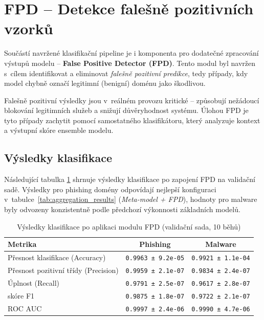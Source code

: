 \section{FPD – Detekce falešně pozitivních vzorků}
\label{sec:fpd}

Součástí navržené klasifikační pipeline je i komponenta pro dodatečné zpracování výstupů modelu – \textbf{False Positive Detector (FPD)}. Tento modul byl navržen s~cílem identifikovat a eliminovat \textit{falešně pozitivní predikce}, tedy případy, kdy model chybně označí legitimní (benigní) doménu jako škodlivou.

Falešně pozitivní výsledky jsou v~reálném provozu kritické – způsobují nežádoucí blokování legitimních služeb a snižují důvěryhodnost systému. Úlohou FPD je tyto případy zachytit pomocí samostatného klasifikátoru, který analyzuje kontext a výstupní skóre ensemble modelu.

\subsection{Výsledky klasifikace}
Následující tabulka \ref{tab:fpd_results} shrnuje výsledky klasifikace po zapojení FPD na validační sadě. Výsledky pro phishing domény odpovídají nejlepší konfiguraci v~tabulce~\ref{tab:aggregation_results} (\textit{Meta-model + FPD}), hodnoty pro malware byly odvozeny konzistentně podle předchozí výkonnosti základních modelů.

\begin{table}[H]
\centering
\begin{tabular}{|l|c|c|}
\hline
\textbf{Metrika} & \textbf{Phishing} & \textbf{Malware} \\
\hline
Přesnost klasifikace (Accuracy)     & \texttt{0.9963 ± 9.2e-05}  & \texttt{0.9921 ± 1.1e-04} \\
Přesnost pozitivní třídy (Precision)    & \texttt{0.9959 ± 2.1e-07}  & \texttt{0.9834 ± 2.4e-07} \\
Úplnost (Recall)        & \texttt{0.9791 ± 2.5e-07}  & \texttt{0.9617 ± 2.8e-07} \\
skóre F1                 & \texttt{0.9875 ± 1.8e-07}  & \texttt{0.9722 ± 2.1e-07} \\
ROC AUC                 & \texttt{0.9997 ± 2.4e-06}  & \texttt{0.9990 ± 4.7e-06} \\
\hline
\end{tabular}
\caption{Výsledky klasifikace po aplikaci modulu FPD (validační sada, 10 běhů)}
\label{tab:fpd_results}
\end{table}


